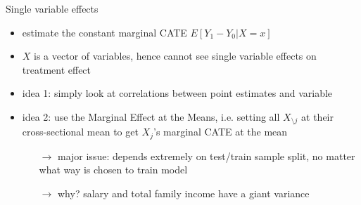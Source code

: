 \documentclass[a4paper, 12pt]{beamer}
\begin{document}
\begin{frame}{Single variable effects}
  \begin{itemize}
    \item estimate the constant marginal CATE $E[Y_1 - Y_0|X=x]$ 
    \item $X$ is a vector of variables, hence cannot see single variable effects on treatment effect 
    \item idea 1: simply look at correlations between point estimates and variable 
    \item idea 2: use the Marginal Effect at the Means, i.e. setting all $X_{\setminus j}$ at their cross-sectional mean to get $X_j$'s marginal CATE at the mean 
    \begin{itemize}
      \item[$\rightarrow$] major issue: depends extremely on test/train sample split, no matter what way is chosen to train model
      \item[$\rightarrow$] why? salary and total family income have a giant variance
    \end{itemize}
  \end{itemize}
\end{frame}
\end{document}
